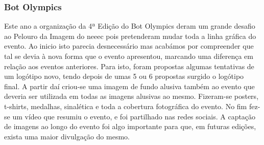 
\subsubsection{Bot Olympics}

Este ano a organização da 4ª Edição do Bot Olympics deram um grande desafio ao Pelouro da Imagem do \acrshort{neeec} pois pretenderam mudar toda a linha gráfica do evento. Ao inicio isto parecia desnecessário mas acabámos por compreender que tal se devia à nova forma que o evento apresentou, marcando uma diferença em relação aos eventos anteriores. Para isto, foram propostas algumas tentativas de um logótipo novo, tendo depois de umas 5 ou 6 propostas surgido o logótipo final. A partir daí criou-se uma imagem de fundo alusiva também ao evento que deveria ser utilizada em todas as imagens alusivas ao mesmo. Fizeram-se posters, t-shirts, medalhas, sinalética e toda a cobertura fotográfica do evento. No fim fez-se um vídeo que resumiu o evento, e foi partilhado nas redes sociais. A captação de imagens ao longo do evento foi algo importante para que, em futuras edições, exista uma maior divulgação do mesmo.
